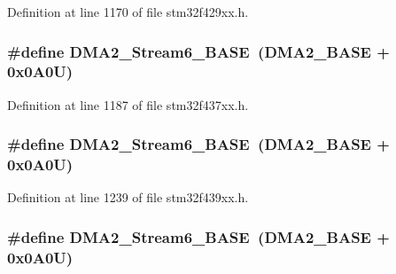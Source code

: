 Definition at line 1170 of file stm32f429xx.\+h.

\subsubsection[{\texorpdfstring{D\+M\+A2\+\_\+\+Stream6\+\_\+\+B\+A\+SE}{DMA2_Stream6_BASE}}]{\setlength{\rightskip}{0pt plus 5cm}\#define D\+M\+A2\+\_\+\+Stream6\+\_\+\+B\+A\+SE~({\bf D\+M\+A2\+\_\+\+B\+A\+SE} + 0x0\+A0\+U)}\hypertarget{group___peripheral__memory__map_ga5e81174c96fd204fa7c82c815e85c8e6}{}\label{group___peripheral__memory__map_ga5e81174c96fd204fa7c82c815e85c8e6}


Definition at line 1187 of file stm32f437xx.\+h.

\subsubsection[{\texorpdfstring{D\+M\+A2\+\_\+\+Stream6\+\_\+\+B\+A\+SE}{DMA2_Stream6_BASE}}]{\setlength{\rightskip}{0pt plus 5cm}\#define D\+M\+A2\+\_\+\+Stream6\+\_\+\+B\+A\+SE~({\bf D\+M\+A2\+\_\+\+B\+A\+SE} + 0x0\+A0\+U)}\hypertarget{group___peripheral__memory__map_ga5e81174c96fd204fa7c82c815e85c8e6}{}\label{group___peripheral__memory__map_ga5e81174c96fd204fa7c82c815e85c8e6}


Definition at line 1239 of file stm32f439xx.\+h.

\subsubsection[{\texorpdfstring{D\+M\+A2\+\_\+\+Stream6\+\_\+\+B\+A\+SE}{DMA2_Stream6_BASE}}]{\setlength{\rightskip}{0pt plus 5cm}\#define D\+M\+A2\+\_\+\+Stream6\+\_\+\+B\+A\+SE~({\bf D\+M\+A2\+\_\+\+B\+A\+SE} + 0x0\+A0\+U)}\hypertarget{group___peripheral__memory__map_ga5e81174c96fd204fa7c82c815e85c8e6}{}\label{group___peripheral__memory__map_ga5e81174c96fd204fa7c82c815e85c8e6}


